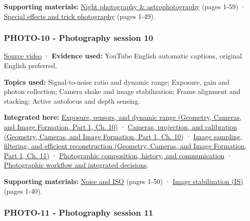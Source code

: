 \textbf{Supporting materials:} \href{https://drive.google.com/open?id=0B6w2XfPHEcZYaTJ5M2RhZzBwWTg}{Night photography \& astrophotography} (pages 1-59) · \href{https://drive.google.com/open?id=0B6w2XfPHEcZYdklBY3BfVTFSSnM}{Special effects and trick photography} (pages 1-49).

\subsubsection{PHOTO-10 - Photography session 10}\label{04-visual-computing-ii-ch036-photo-10---photography-session-10}

\hypertarget{04-visual-computing-ii-ch036-photo-10---photography-session-10}{}

\href{https://www.youtube.com/watch?v=ia9w4ZtdULs}{Source video} · \textbf{Evidence used:} YouTube English automatic captions, original English preferred.

\textbf{Topics used:} Signal-to-noise ratio and dynamic range; Exposure, gain and photon collection; Camera shake and image stabilization; Frame alignment and stacking; Active autofocus and depth sensing.

\textbf{Integrated here:} \href{../03-Geometry-Cameras-and-Image-Formation-P01/main.pdf\#nameddest=03-visual-computing-i-ch003-exposure-sensors-and-dynamic-range}{Exposure, sensors, and dynamic range (Geometry, Cameras, and Image Formation, Part 1, Ch. 10)} · \href{../03-Geometry-Cameras-and-Image-Formation-P01/main.pdf\#nameddest=03-visual-computing-i-ch003-cameras-projection-and-calibration}{Cameras, projection, and calibration (Geometry, Cameras, and Image Formation, Part 1, Ch. 10)} · \href{../03-Geometry-Cameras-and-Image-Formation-P01/main.pdf\#nameddest=03-visual-computing-i-ch004-image-sampling-filtering-and-efficient-reconstruction}{Image sampling, filtering, and efficient reconstruction (Geometry, Cameras, and Image Formation, Part 1, Ch. 11)} · \hyperref[04-visual-computing-ii-ch034-photographic-composition-history-and-communication]{Photographic composition, history, and communication} · \hyperref[04-visual-computing-ii-ch034-photographic-workflow-and-integrated-decisions]{Photographic workflow and integrated decisions}.

\textbf{Supporting materials:} \href{https://drive.google.com/open?id=0B6w2XfPHEcZYS2xETmR4SVlIczg}{Noise and ISO} (pages 1-50) · \href{https://drive.google.com/open?id=0B6w2XfPHEcZYcFpESFU4dEM3QkE}{Image stabilization (IS)} (pages 1-40).

\subsubsection{PHOTO-11 - Photography session 11}\label{04-visual-computing-ii-ch036-photo-11---photography-session-11}

